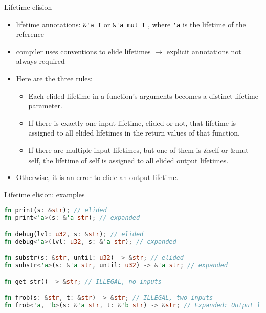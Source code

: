 \documentclass{beamer}
\begin{document}
\begin{frame}[fragile]{Lifetime elision}
\begin{itemize}
  \item lifetime annotations: \verb|&'a T| or \verb|&'a mut T| , where \verb|'a| is the lifetime of the reference
  \item compiler uses conventions to elide lifetimes $\rightarrow$ explicit annotations not always required
  \item Here are the three rules:
  \begin{itemize}
    \item Each elided lifetime in a function’s arguments becomes a distinct lifetime parameter.
    \item If there is exactly one input lifetime, elided or not, that lifetime is assigned to all elided lifetimes in the return values of that function.
    \item If there are multiple input lifetimes, but one of them is &self or &mut self, the lifetime of self is assigned to all elided output lifetimes.
  \end{itemize}
  \item Otherwise, it is an error to elide an output lifetime.
\end{itemize}
\end{frame}


\begin{frame}[fragile]{Lifetime elision: examples}
\begin{lstlisting}[language=Rust]
fn print(s: &str); // elided
fn print<'a>(s: &'a str); // expanded

fn debug(lvl: u32, s: &str); // elided
fn debug<'a>(lvl: u32, s: &'a str); // expanded

fn substr(s: &str, until: u32) -> &str; // elided
fn substr<'a>(s: &'a str, until: u32) -> &'a str; // expanded

fn get_str() -> &str; // ILLEGAL, no inputs

fn frob(s: &str, t: &str) -> &str; // ILLEGAL, two inputs
fn frob<'a, 'b>(s: &'a str, t: &'b str) -> &str; // Expanded: Output lifetime is ambiguous
\end{lstlisting}
\end{frame}
\end{document}
